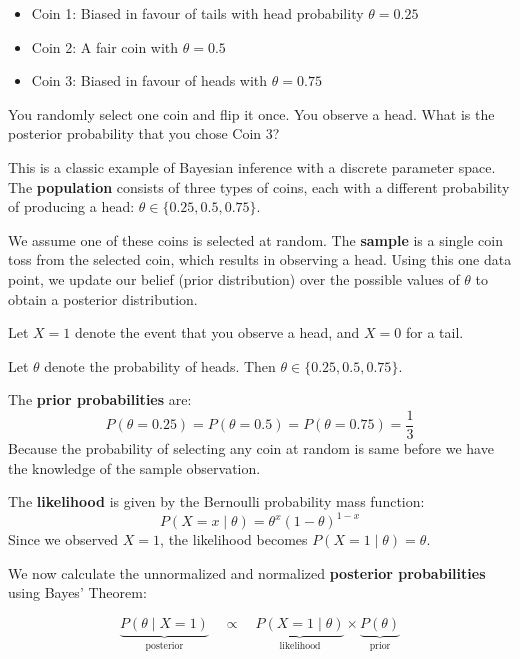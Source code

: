 \documentclass[twoside]{book}
\begin{document}
\begin{itemize}
    \item Coin 1: Biased in favour of tails with head probability $\theta = 0.25$
    \item Coin 2: A fair coin with $\theta = 0.5$
    \item Coin 3: Biased in favour of heads with $\theta = 0.75$
\end{itemize}

You randomly select one coin and flip it once. You observe a head. What is the posterior probability that you chose Coin 3?

This is a classic example of Bayesian inference with a discrete parameter space.
The \textbf{population} consists of three types of coins, each with a different probability of producing a head: $\theta \in \{0.25, 0.5, 0.75\}$.


We assume one of these coins is selected at random. The \textbf{sample} is a single coin toss from the selected coin, which results in observing a head.
Using this one data point, we update our belief (prior distribution) over the possible values of $\theta$ to obtain a posterior distribution.

Let $X = 1$ denote the event that you observe a head, and $X = 0$ for a tail.

Let $\theta$ denote the probability of heads. Then $\theta \in \{0.25, 0.5, 0.75\}$.

The \textbf{prior probabilities} are:
\[
P(\theta = 0.25) = P(\theta = 0.5) = P(\theta = 0.75) = \frac{1}{3}
\]
Because the probability of selecting any coin at random is same before we have the knowledge of the sample observation.

The \textbf{likelihood} is given by the Bernoulli probability mass function:
\[
P(X = x \mid \theta) = \theta^x (1 - \theta)^{1 - x}
\]
Since we observed $X = 1$, the likelihood becomes $P(X=1 \mid \theta) = \theta$.

We now calculate the unnormalized and normalized \textbf{posterior probabilities} using Bayes' Theorem:

\[
\underbrace{P(\theta \mid X = 1)}_{\text{posterior}} \quad \propto \quad \underbrace{ P(X=1 \mid \theta)}_{\text{likelihood}} \times \underbrace{P(\theta)}_{\text{prior}}
\]
\end{document}
